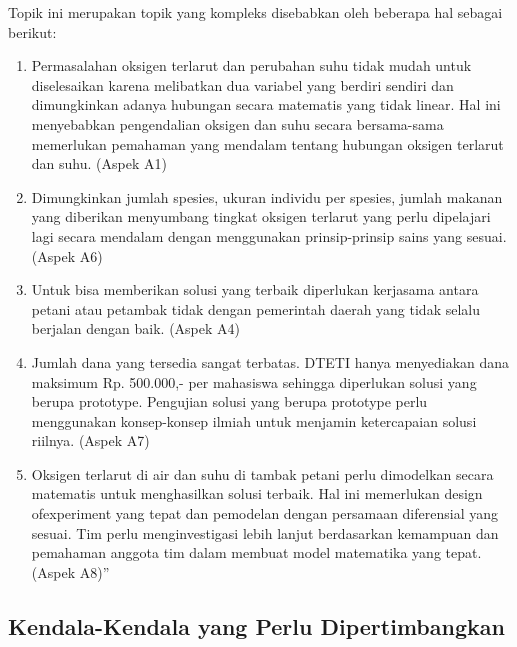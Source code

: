     Topik ini merupakan topik yang kompleks disebabkan oleh beberapa hal sebagai berikut:
    \begin{enumerate}[label=\alph*.]
        \item Permasalahan oksigen terlarut dan perubahan suhu tidak mudah untuk diselesaikan karena melibatkan dua variabel yang berdiri sendiri dan dimungkinkan adanya hubungan secara matematis yang tidak linear. Hal ini menyebabkan pengendalian oksigen dan suhu secara bersama-sama memerlukan pemahaman yang mendalam tentang hubungan oksigen terlarut dan suhu. (Aspek A1)
        \item Dimungkinkan jumlah spesies, ukuran individu per spesies, jumlah makanan yang diberikan menyumbang tingkat oksigen terlarut yang perlu dipelajari lagi secara mendalam dengan menggunakan prinsip-prinsip sains yang sesuai. (Aspek A6)
        \item Untuk bisa memberikan solusi yang terbaik diperlukan kerjasama antara petani atau petambak tidak dengan pemerintah daerah yang tidak selalu berjalan dengan baik. (Aspek A4)
        \item Jumlah dana yang tersedia sangat terbatas. DTETI hanya menyediakan dana maksimum Rp. 500.000,- per mahasiswa sehingga diperlukan solusi yang berupa prototype. Pengujian solusi yang berupa prototype perlu menggunakan konsep-konsep ilmiah untuk menjamin ketercapaian solusi riilnya. (Aspek A7)
        \item Oksigen terlarut di air dan suhu di tambak petani perlu dimodelkan secara matematis untuk menghasilkan solusi terbaik. Hal ini memerlukan design ofexperiment yang tepat dan pemodelan dengan persamaan diferensial yang sesuai. Tim perlu menginvestigasi lebih lanjut berdasarkan kemampuan dan pemahaman anggota tim dalam membuat model matematika yang tepat. (Aspek A8)”
    \end{enumerate}

    \subsection{Kendala-Kendala yang Perlu Dipertimbangkan} 
    \label{subsec:Kendala-Kendala_yang_Perlu_Dipertimbangkan}

